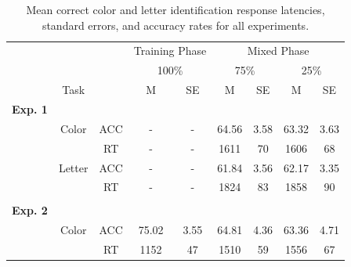 \documentclass[]{DissertateCUNY}
\begin{document}
\begin{table}[htbp]
\caption{Mean correct color and letter identification response latencies, standard errors, and accuracy rates for all experiments.}
\label{IC_table}
\centering
\begin{tabular}{cccccccccc}
 & & & & \multicolumn{2}{c}{Training Phase} & \multicolumn{4}{c}{Mixed Phase} \\
\cmidrule(rl){5-6}
\cmidrule(rl){7-10}
 & & & & \multicolumn{2}{c}{100\%} & \multicolumn{2}{c}{75\%} & \multicolumn{2}{c}{25\%}  \\
\cmidrule(rl){5-6}
\cmidrule(rl){7-8}
\cmidrule(rl){9-10}
 & & \multicolumn{1}{c}{Task} & & \multicolumn{1}{c}{M} & \multicolumn{1}{c}{SE} & \multicolumn{1}{c}{M} & \multicolumn{1}{c}{SE} & \multicolumn{1}{c}{M} & \multicolumn{1}{c}{SE} \\
\midrule
\multicolumn{2}{l}{\textbf{Exp. 1}}  &   &    &     &     &    &  & & \\
& & \multicolumn{1}{c}{Color} & \multicolumn{1}{c}{ACC} & \multicolumn{1}{c}{-} & \multicolumn{1}{c}{-} & \multicolumn{1}{c}{64.56} & \multicolumn{1}{c}{3.58} & \multicolumn{1}{c}{63.32} & \multicolumn{1}{c}{3.63} \\
& & & \multicolumn{1}{c}{RT} & \multicolumn{1}{c}{-} & \multicolumn{1}{c}{-} & \multicolumn{1}{c}{1611} & \multicolumn{1}{c}{70} & \multicolumn{1}{c}{1606} & \multicolumn{1}{c}{68} \\
& & \multicolumn{1}{c}{Letter} & \multicolumn{1}{c}{ACC} & \multicolumn{1}{c}{-} & \multicolumn{1}{c}{-} & \multicolumn{1}{c}{61.84} & \multicolumn{1}{c}{3.56} & \multicolumn{1}{c}{62.17} & \multicolumn{1}{c}{3.35} \\
& & & \multicolumn{1}{c}{RT} & \multicolumn{1}{c}{-} & \multicolumn{1}{c}{-} & \multicolumn{1}{c}{1824} & \multicolumn{1}{c}{83} & \multicolumn{1}{c}{1858} & \multicolumn{1}{c}{90} \\
\cmidrule(l){2-10}
 &  & & & & & & & & \\
\multicolumn{2}{l}{\textbf{Exp. 2}}  &   &    &     &     &    &  & & \\
& & \multicolumn{1}{c}{Color} & \multicolumn{1}{c}{ACC} & \multicolumn{1}{c}{75.02} & \multicolumn{1}{c}{3.55} & \multicolumn{1}{c}{64.81} & \multicolumn{1}{c}{4.36} & \multicolumn{1}{c}{63.36} & \multicolumn{1}{c}{4.71} \\
& & & \multicolumn{1}{c}{RT} & \multicolumn{1}{c}{1152} & \multicolumn{1}{c}{47} & \multicolumn{1}{c}{1510} & \multicolumn{1}{c}{59} & \multicolumn{1}{c}{1556} & \multicolumn{1}{c}{67} \\

\end{tabular}
\end{table}
\end{document}

